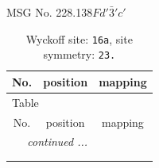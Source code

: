 \documentclass[fleqn,8pt]{jsarticle}
\begin{document}
\setcounter{MaxMatrixCols}{32}

\renewcommand{\tablename}{Table~}
\renewcommand{\figurename}{Figure~}
\begin{center}
\LARGE
MSG No. 228.138\quad$Fd'\bar{3}'c'$
\end{center}
\renewcommand{\arraystretch}{1.2}
\begin{longtable}{ccc}
\caption{Wyckoff site: {\tt 16a}, site symmetry: {\tt 23.}}
 \\
 \hline \hline
No. & position & mapping \\ \hline \endfirsthead

\multicolumn{2}{l}{\tablename\ \thetable{}} \\
 \hline \hline
No. & position & mapping \\ \hline \endhead

 \hline \hline
\multicolumn{2}{r}{\footnotesize\it continued ...} \\ \endfoot

 \hline \hline
\multicolumn{2}{r}{} \\ \endlastfoot


\end{longtable}
\end{document}
